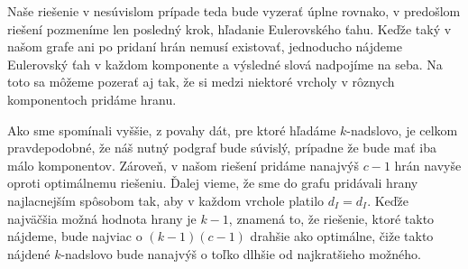 Naše riešenie v nesúvislom prípade teda bude vyzerať úplne rovnako, v predošlom
riešení pozmeníme len posledný krok, hľadanie Eulerovského ťahu. Keďže taký v našom grafe
ani po pridaní hrán nemusí existovať, jednoducho nájdeme Eulerovský ťah v každom komponente
a výsledné slová nadpojíme na seba. Na toto sa môžeme pozerať aj tak, že si medzi niektoré
vrcholy v rôznych komponentoch pridáme hranu.

Ako sme spomínali vyššie, z povahy dát, pre ktoré hľadáme $k$-nadslovo,
je celkom pravdepodobné, že náš nutný podgraf bude súvislý, prípadne že bude mať iba málo
komponentov. Zároveň, v našom riešení pridáme nanajvýš $c - 1$ hrán navyše oproti
optimálnemu riešeniu. Ďalej vieme, že sme do grafu pridávali hrany najlacnejším spôsobom
tak, aby v každom vrchole platilo $d_I = d_I$. Keďže najväčšia možná hodnota
hrany je $k-1$, znamená to, že riešenie, ktoré takto nájdeme, bude najviac o $(k - 1)(c - 1)$ drahšie
ako optimálne, čiže takto nájdené $k$-nadslovo bude nanajvýš o toľko dlhšie od najkratšieho možného.

